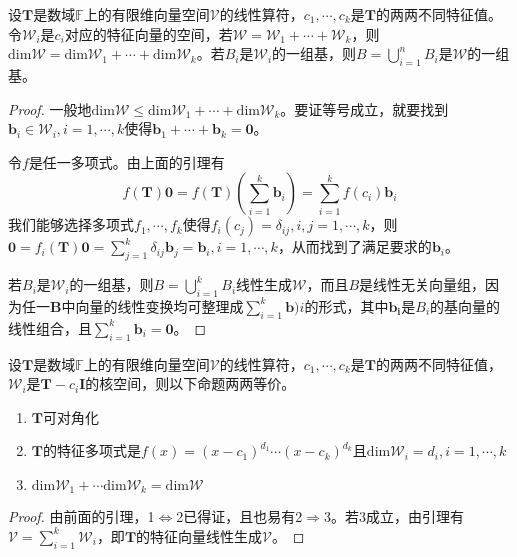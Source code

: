 \documentclass[main.tex]{subfiles}
\begin{document}
\begin{lemma}
设$\mathbf{T}$是数域$\mathbb{F}$上的有限维向量空间$\mathcal{V}$的线性算符，$c_1,\cdots,c_k$是$\mathbf{T}$的两两不同特征值。令$\mathcal{W}_i$是$c_i$对应的特征向量的空间，若$\mathcal{W}=\mathcal{W}_1+\cdots+\mathcal{W}_k$，则$\mathrm{dim}\mathcal{W}=\mathrm{dim}\mathcal{W}_1+\cdots+\mathrm{dim}\mathcal{W}_k$。若$B_i$是$\mathcal{W}_i$的一组基，则$B=\bigcup_{i=1}^nB_i$是$\mathcal{W}$的一组基。
\end{lemma}
\begin{proof}
一般地$\mathrm{dim}\mathcal{W}\leq\mathrm{dim}\mathcal{W}_1+\cdots+\mathrm{dim}\mathcal{W}_k$。要证等号成立，就要找到$\mathbf{b}_i\in\mathcal{W}_i,i=1,\cdots,k$使得$\mathbf{b}_1+\cdots+\mathbf{b}_k=\mathbf{0}$。

令$f$是任一多项式。由上面的引理有
\[
f\left(\mathbf{T}\right)\mathbf{0}=f\left(\mathbf{T}\right)\left(\sum_{i=1}^k\mathbf{b}_i\right)=\sum_{i=1}^kf\left(c_i\right)\mathbf{b}_i\]
我们能够选择多项式$f_1,\cdots,f_k$使得$f_i\left(c_j\right)=\delta_{ij},i,j=1,\cdots,k$，则$\mathbf{0}=f_i\left(\mathbf{T}\right)\mathbf{0}=\sum_{j=1}^k\delta_{ij}\mathbf{b}_j=\mathbf{b}_i,i=1,\cdots,k$，从而找到了满足要求的$\mathbf{b}_i$。

若$B_i$是$\mathcal{W}_i$的一组基，则$B=\bigcup_{i=1}^kB_i$线性生成$\mathcal{W}$，而且$B$是线性无关向量组，因为任一$\mathbf{B}$中向量的线性变换均可整理成$\sum_{i=1}^k\mathbf{b})i$的形式，其中$\mathbf{b_i}$是$B_i$的基向量的线性组合，且$\sum_{i=1}^k\mathbf{b}_i=\mathbf{0}$。
\end{proof}

\begin{theorem}
设$\mathbf{T}$是数域$\mathbb{F}$上的有限维向量空间$\mathcal{V}$的线性算符，$c_1,\cdots,c_k$是$\mathbf{T}$的两两不同特征值，$\mathcal{W}_i$是$\mathbf{T}-c_i\mathbf{I}$的核空间，则以下命题两两等价。
\begin{enumerate}
    \item $\mathbf{T}$可对角化
    \item $\mathbf{T}$的特征多项式是$f\left(x\right)=\left(x-c_1\right)^{d_1}\cdots\left(x-c_k\right)^{d_k}$且$\mathrm{dim}\mathcal{W}_i=d_i,i=1,\cdots,k$
    \item $\mathrm{dim}\mathcal{W}_1+\cdots\mathrm{dim}\mathcal{W}_k=\mathrm{dim}\mathcal{W}$
\end{enumerate}
\end{theorem}
\begin{proof}
由前面的引理，1$\Leftrightarrow$2已得证，且也易有2$\Rightarrow$3。若3成立，由引理有$\mathcal{V}=\sum_{i=1}^k\mathcal{W}_i$，即$\mathbf{T}$的特征向量线性生成$\mathcal{V}$。
\end{proof}
\end{document}
